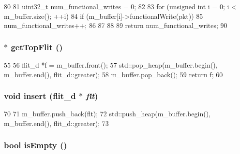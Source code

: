 \begin{DoxyCode}
80 {
81     uint32_t num_functional_writes = 0;
82 
83     for (unsigned int i = 0; i < m_buffer.size(); ++i) {
84         if (m_buffer[i]->functionalWrite(pkt)) {
85             num_functional_writes++;
86         }
87     }
88 
89     return num_functional_writes;
90 }
\end{DoxyCode}
\hypertarget{classflitBuffer__d_a5b9261af9ccdd053e2311fb749c88fa6}{
\subsubsection[{getTopFlit}]{$\ast$ getTopFlit ()}}
\label{classflitBuffer__d_a5b9261af9ccdd053e2311fb749c88fa6}



\begin{DoxyCode}
55     {
56         flit_d *f = m_buffer.front();
57         std::pop_heap(m_buffer.begin(), m_buffer.end(), flit_d::greater);
58         m_buffer.pop_back();
59         return f;
60     }
\end{DoxyCode}
\hypertarget{classflitBuffer__d_aaf9d98f29475b88e50b24a96f47f8dc1}{
\subsubsection[{insert}]{\setlength{\rightskip}{0pt plus 5cm}void insert ({\bf flit\_\-d} $\ast$ {\em flt})}}
\label{classflitBuffer__d_aaf9d98f29475b88e50b24a96f47f8dc1}



\begin{DoxyCode}
70     {
71         m_buffer.push_back(flt);
72         std::push_heap(m_buffer.begin(), m_buffer.end(), flit_d::greater);
73     }
\end{DoxyCode}
\hypertarget{classflitBuffer__d_af337ffd75e4f019ce15302c60715d84b}{
\subsubsection[{isEmpty}]{\setlength{\rightskip}{0pt plus 5cm}bool isEmpty ()}}
\label{classflitBuffer__d_af337ffd75e4f019ce15302c60715d84b}



